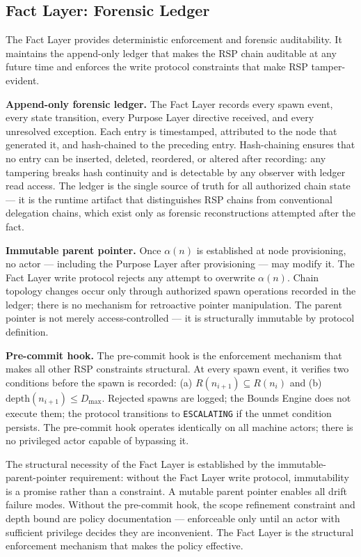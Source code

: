 \subsection{Fact Layer: Forensic Ledger}
\label{sec:rs-fact-layer}

The Fact Layer provides deterministic enforcement and forensic auditability. It maintains the append-only ledger that makes the RSP chain auditable at any future time and enforces the write protocol constraints that make RSP tamper-evident.

\medskip
\noindent\textbf{Append-only forensic ledger.} The Fact Layer records every spawn event, every state transition, every Purpose Layer directive received, and every unresolved exception. Each entry is timestamped, attributed to the node that generated it, and hash-chained to the preceding entry. Hash-chaining ensures that no entry can be inserted, deleted, reordered, or altered after recording: any tampering breaks hash continuity and is detectable by any observer with ledger read access. The ledger is the single source of truth for all authorized chain state --- it is the runtime artifact that distinguishes RSP chains from conventional delegation chains, which exist only as forensic reconstructions attempted after the fact.

\medskip
\noindent\textbf{Immutable parent pointer.} Once $\alpha(n)$ is established at node provisioning, no actor --- including the Purpose Layer after provisioning --- may modify it. The Fact Layer write protocol rejects any attempt to overwrite $\alpha(n)$. Chain topology changes occur only through authorized spawn operations recorded in the ledger; there is no mechanism for retroactive pointer manipulation. The parent pointer is not merely access-controlled --- it is structurally immutable by protocol definition.

\medskip
\noindent\textbf{Pre-commit hook.} The pre-commit hook is the enforcement mechanism that makes all other RSP constraints structural. At every spawn event, it verifies two conditions before the spawn is recorded: (a) $R(n_{i+1}) \subseteq R(n_i)$ and (b) $\mathrm{depth}(n_{i+1}) \leq D_{\mathrm{max}}$. Rejected spawns are logged; the Bounds Engine does not execute them; the protocol transitions to \texttt{ESCALATING} if the unmet condition persists. The pre-commit hook operates identically on all machine actors; there is no privileged actor capable of bypassing it.

The structural necessity of the Fact Layer is established by the immutable-parent-pointer requirement: without the Fact Layer write protocol, immutability is a promise rather than a constraint. A mutable parent pointer enables all drift failure modes. Without the pre-commit hook, the scope refinement constraint and depth bound are policy documentation --- enforceable only until an actor with sufficient privilege decides they are inconvenient. The Fact Layer is the structural enforcement mechanism that makes the policy effective.

